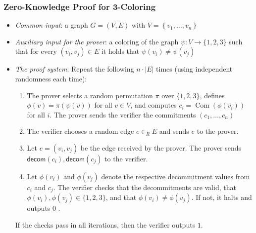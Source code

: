 \documentclass{beamer}
\begin{document}
    \begin{frame}
        \frametitle{Zero-Knowledge Proof for 3-Coloring}
    
        \begin{itemize}
            \item \emph{Common input}: a graph $G=(V, E)$ with $V=\left\{v_{1}, \ldots, v_{n}\right\}$
            \item \emph{Auxiliary input for the prover}: a coloring of the graph $\psi: V \rightarrow\{1,2,3\}$ such that for every $\left(v_{i}, v_{j}\right) \in E$ it holds that $\psi\left(v_{i}\right) \neq \psi\left(v_{j}\right)$
            \item \emph{The proof system}: Repeat the following $n \cdot|E|$ times (using independent randomness each time):
            \begin{enumerate}
                \item The prover selects a random permutation $\pi$ over $\{1,2,3\}$, defines $\phi(v)=\pi(\psi(v))$ for all $v \in V$, and computes $c_{i}=\operatorname{Com}\left(\phi\left(v_{i}\right)\right)$ for all $i$. The prover sends the verifier the commitments $\left(c_{1}, \ldots, c_{n}\right)$
                \item The verifier chooses a random edge $e \in_{R} E$ and sends $e$ to the prover.
                \item Let $e=\left(v_{i}, v_{j}\right)$ be the edge received by the prover. The prover sends $\mathsf{decom}\left(c_{i}\right), \mathsf{decom}\left(c_{j}\right)$ to the verifier.
                \item Let $\phi\left(v_{i}\right)$ and $\phi\left(v_{j}\right)$ denote the respective decommitment values from $c_{i}$ and $c_{j} .$ The verifier checks that the decommitments are valid, that $\phi\left(v_{i}\right), \phi\left(v_{j}\right) \in\{1,2,3\}$, and that $\phi\left(v_{i}\right) \neq \phi\left(v_{j}\right)$. If not, it halts and outputs 0 .
            \end{enumerate}
            If the checks pass in all iterations, then the verifier outputs $1 .$
        \end{itemize}
        
    
    \end{frame}
\end{document}

